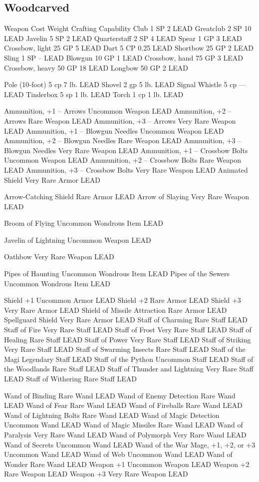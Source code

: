 \subsection*{Woodcarved} \label{ssec::woodcarved}
Weapon	Cost	Weight	Crafting Capability
Club	1 SP	2	LEAD
Greatclub	2 SP	10	LEAD
Javelin	5 SP	2	LEAD
Quarterstaff	2 SP	4	LEAD
Spear	1 GP	3	LEAD
Crossbow, light	25 GP	5	LEAD
Dart	5 CP	0.25	LEAD
Shortbow	25 GP	2	LEAD
Sling	1 SP	–	LEAD
Blowgun	10 GP	1	LEAD
Crossbow, hand	75 GP	3	LEAD
Crossbow, heavy	50 GP	18	LEAD
Longbow	50 GP	2	LEAD

Pole (10-foot)	5 cp	7 lb.	LEAD
Shovel	2 gp	5 lb.	LEAD
Signal Whistle	5 cp	—	LEAD
Tinderbox	5 sp	1 lb.	LEAD
Torch	1 cp	1 lb.	LEAD

Ammunition, +1 – Arrows	Uncommon	Weapon	LEAD
Ammunition, +2 – Arrows	Rare	Weapon	LEAD
Ammunition, +3 – Arrows	Very Rare	Weapon	LEAD
Ammunition, +1 – Blowgun Needles	Uncommon	Weapon	LEAD
Ammunition, +2 – Blowgun Needles	Rare	Weapon	LEAD
Ammunition, +3 – Blowgun Needles	Very Rare	Weapon	LEAD
Ammunition, +1 – Crossbow Bolts	Uncommon	Weapon	LEAD
Ammunition, +2 – Crossbow Bolts	Rare	Weapon	LEAD
Ammunition, +3 – Crossbow Bolts	Very Rare	Weapon	LEAD
Animated Shield	Very Rare	Armor	LEAD

Arrow-Catching Shield	Rare	Armor	LEAD
Arrow of Slaying	Very Rare	Weapon	LEAD

Broom of Flying	Uncommon	Wondrous Item	LEAD

Javelin of Lightning	Uncommon	Weapon	LEAD

Oathbow	Very Rare	Weapon	LEAD

Pipes of Haunting	Uncommon	Wondrous Item	LEAD
Pipes of the Sewers	Uncommon	Wondrous Item	LEAD

Shield +1	Uncommon	Armor	LEAD
Shield +2	Rare	Armor	LEAD
Shield +3	Very Rare	Armor	LEAD
Shield of Missile Attraction	Rare	Armor	LEAD
Spellguard Shield	Very Rare	Armor	LEAD
Staff of Charming	Rare	Staff	LEAD
Staff of Fire	Very Rare	Staff	LEAD
Staff of Frost	Very Rare	Staff	LEAD
Staff of Healing	Rare	Staff	LEAD
Staff of Power	Very Rare	Staff	LEAD
Staff of Striking	Very Rare	Staff	LEAD
Staff of Swarming Insects	Rare	Staff	LEAD
Staff of the Magi	Legendary	Staff	LEAD
Staff of the Python	Uncommon	Staff	LEAD
Staff of the Woodlands	Rare	Staff	LEAD
Staff of Thunder and Lightning	Very Rare	Staff	LEAD
Staff of Withering	Rare	Staff	LEAD

Wand of Binding	Rare	Wand	LEAD
Wand of Enemy Detection	Rare	Wand	LEAD
Wand of Fear	Rare	Wand	LEAD
Wand of Fireballs	Rare	Wand	LEAD
Wand of Lightning Bolts	Rare	Wand	LEAD
Wand of Magic Detection	Uncommon	Wand	LEAD
Wand of Magic Missiles	Rare	Wand	LEAD
Wand of Paralysis	Very Rare	Wand	LEAD
Wand of Polymorph	Very Rare	Wand	LEAD
Wand of Secrets	Uncommon	Wand	LEAD
Wand of the War Mage, +1, +2, or +3	Uncommon	Wand	LEAD
Wand of Web	Uncommon	Wand	LEAD
Wand of Wonder	Rare	Wand	LEAD
Weapon +1	Uncommon	Weapon	LEAD
Weapon +2   Rare        Weapon  LEAD
Weapon +3   Very Rare   Weapon  LEAD
